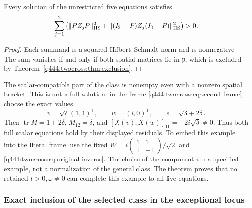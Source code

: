 \begin{corollary}
Every solution of the unrestricted five equations satisfies
\[
\sum_{j=1}^2\left(
\|PZ_jP\|_{\rm HS}^2+
\|(I_3-P)Z_j(I_3-P)\|_{\rm HS}^2\right)>0.
\]
\end{corollary}
\begin{proof}
Each summand is a squared Hilbert--Schmidt norm and is nonnegative.
The sum vanishes if and only if both spatial matrices lie in $\mathfrak p$,
which is excluded by Theorem~\ref{q444:twocross:thm:exclusion}.
\end{proof}

The scalar-compatible part of the class is nonempty even with a nonzero
spatial bracket. This is not a full solution: in the frame
\eqref{q444:twocross:eq:second-frame}, choose the exact values
\[
v=\sqrt\delta(1,1)^{\mathsf T},\qquad w=(i,0)^{\mathsf T},
\qquad e=\sqrt{3+2\delta}.
\]
Then $\operatorname{tr}M=1+2\delta$, $M_{12}=\delta$, and
$[X(v),X(w)]_{11}=-2i\sqrt\delta\ne0$.
Thus both full scalar equations hold by their displayed residuals.
To embed this example into the literal frame, use the fixed
$W=i\left(\begin{smallmatrix}1&1\\1&-1\end{smallmatrix}\right)/\sqrt2$
and \eqref{q444:twocross:eq:original-inverse}. The choice of the component $i$ is a
specified example, not a normalization of the general class. The theorem
proves that no retained $t>0,\omega\ne0$ can complete this example to all
five equations.

\subsubsection{Exact inclusion of the selected class in the exceptional locus}
\label{q444:twocross:exceptional-inclusion-section}

